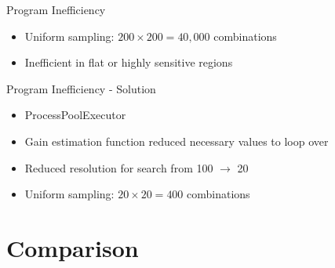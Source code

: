 \documentclass{beamer}
\begin{document}
\begin{frame}{Program Inefficiency}
\begin{itemize}
  \item Uniform sampling: $200 \times 200 = 40{,}000$ combinations
  \item Inefficient in flat or highly sensitive regions
\end{itemize}
\end{frame}


\begin{frame}{Program Inefficiency - Solution}
\begin{itemize}
  \item ProcessPoolExecutor
  \item Gain estimation function reduced necessary values to loop over
  \item Reduced resolution for search from 100 $\longrightarrow$ 20
  \item Uniform sampling: $20 \times 20 = 400$ combinations
\end{itemize}
\end{frame}



\section{Comparison}
\end{document}
